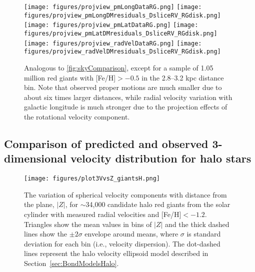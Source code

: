  
\begin{figure}[!ht]
\texttt{[image: figures/projview\_pmLongDataRG.png]}
\texttt{[image: figures/projview\_pmLongDMresiduals\_DsliceRV\_RGdisk.png]}
\texttt{[image: figures/projview\_pmLatDataRG.png]}
\texttt{[image: figures/projview\_pmLatDMresiduals\_DsliceRV\_RGdisk.png]}
\texttt{[image: figures/projview\_radVelDataRG.png]}
\texttt{[image: figures/projview\_radVelDMresiduals\_DsliceRV\_RGdisk.png]}
\caption{Analogous to \autoref{fig:skyComparison}, except for a sample of 1.05 million red giants with [Fe/H]$>-0.5$
  in the 2.8--3.2 kpc distance bin. Note that observed proper motions are much smaller due to about six times larger distances,
  while radial velocity variation with galactic longitude is much stronger due to the projection effects of the rotational velocity component.} 
\label{fig:skyComparisonRG} 
\end{figure}


 
\subsection{Comparison of predicted and observed 3-dimensional velocity distribution for halo stars}

\begin{figure}[ht]
    \centering
    \texttt{[image: figures/plot3VvsZ\_giantsH.png]}
    \caption{The variation of spherical velocity components with distance from the plane, $|Z|$, for $\sim$34,000 candidate halo red giants from the solar cylinder with measured radial velocities and [Fe/H]$<-1.2$. Triangles show the mean values in bins of $|Z|$ and the thick dashed lines show the $\pm2\sigma$ envelope around means, where $\sigma$ is standard deviation for each bin (i.e., velocity dispersion). The dot-dashed lines represent the halo velocity ellipsoid model described in Section~\ref{sec:BondModelsHalo}. \label{fig:3vRGhalo}}
\end{figure}
 

